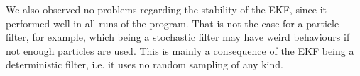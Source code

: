 \documentclass[journal]{IEEEtran}
\begin{document}
We also observed no problems regarding the stability of the EKF, since it performed well in all runs of the program. That is not the case for a particle filter, for example, which being a stochastic filter may have weird behaviours if not enough particles are used. This is mainly a consequence of the EKF being a deterministic filter, i.e. it uses no random sampling of any kind.



%
%
\end{document}
